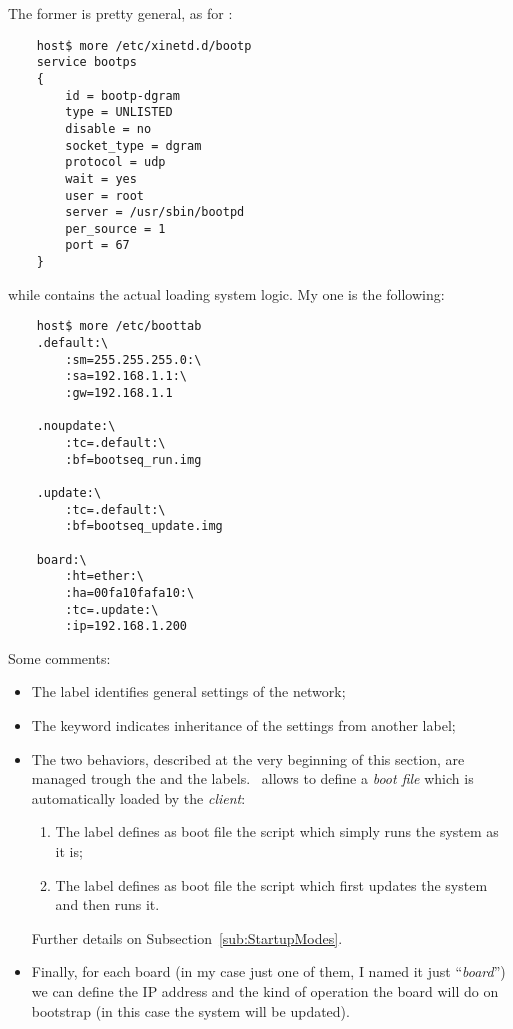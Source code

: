         The former is pretty general, as for \TFTPd:
\begin{lstlisting}
    host$ more /etc/xinetd.d/bootp
    service bootps
    {
        id = bootp-dgram
        type = UNLISTED
        disable = no
        socket_type = dgram
        protocol = udp
        wait = yes
        user = root
        server = /usr/sbin/bootpd
        per_source = 1
        port = 67
    }
\end{lstlisting}
        while  contains the actual loading system
        logic. My one is the following:
\begin{lstlisting}
    host$ more /etc/boottab
    .default:\
        :sm=255.255.255.0:\
        :sa=192.168.1.1:\
        :gw=192.168.1.1

    .noupdate:\
        :tc=.default:\
        :bf=bootseq_run.img

    .update:\
        :tc=.default:\
        :bf=bootseq_update.img

    board:\
        :ht=ether:\
        :ha=00fa10fafa10:\
        :tc=.update:\
        :ip=192.168.1.200
\end{lstlisting}

        Some comments:
        \begin{itemize}

        \item   The  label identifies general settings of
                the network;

        \item   The  keyword indicates inheritance of the
                settings from another label;

        \item   The two behaviors, described at the very beginning of this
                section, are managed trough the  and the
                 labels. \BootP\ allows to define a
                \emph{boot file} which is automatically loaded by the
                \emph{client}:
            \begin{enumerate}
            \item   The  label defines as boot file the
                    script which simply runs the system as it is;
            \item   The \Const{.update} label defines as boot file the
                    script which first updates the system and then runs
                    it.
            \end{enumerate}
                Further details on Subsection~\ref{sub:StartupModes}.

        \item   Finally, for each board (in my case just one of
                them, I named it just ``\emph{board}'') we can define the
                IP address and the kind of operation the board will do on
                bootstrap (in this case the system will be updated).

        \end{itemize}

